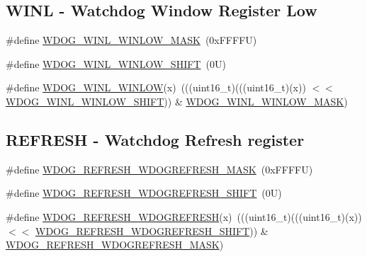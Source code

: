 \subsection*{W\+I\+NL -\/ Watchdog Window Register Low}
\begin{DoxyCompactItemize}
\item 
\#define \mbox{\hyperlink{group___w_d_o_g___register___masks_gadc36bfdccd5e9c14d063a5b36b6a3f6a}{W\+D\+O\+G\+\_\+\+W\+I\+N\+L\+\_\+\+W\+I\+N\+L\+O\+W\+\_\+\+M\+A\+SK}}~(0x\+F\+F\+F\+F\+U)
\item 
\#define \mbox{\hyperlink{group___w_d_o_g___register___masks_ga7f2baf848e4bfe9b0143d073467d1c1a}{W\+D\+O\+G\+\_\+\+W\+I\+N\+L\+\_\+\+W\+I\+N\+L\+O\+W\+\_\+\+S\+H\+I\+FT}}~(0\+U)
\item 
\#define \mbox{\hyperlink{group___w_d_o_g___register___masks_gab55f3f4203f758c69ed8ab7e41db69fd}{W\+D\+O\+G\+\_\+\+W\+I\+N\+L\+\_\+\+W\+I\+N\+L\+OW}}(x)~(((uint16\+\_\+t)(((uint16\+\_\+t)(x)) $<$$<$ \mbox{\hyperlink{group___w_d_o_g___register___masks_ga7f2baf848e4bfe9b0143d073467d1c1a}{W\+D\+O\+G\+\_\+\+W\+I\+N\+L\+\_\+\+W\+I\+N\+L\+O\+W\+\_\+\+S\+H\+I\+FT}})) \& \mbox{\hyperlink{group___w_d_o_g___register___masks_gadc36bfdccd5e9c14d063a5b36b6a3f6a}{W\+D\+O\+G\+\_\+\+W\+I\+N\+L\+\_\+\+W\+I\+N\+L\+O\+W\+\_\+\+M\+A\+SK}})
\end{DoxyCompactItemize}
\subsection*{R\+E\+F\+R\+E\+SH -\/ Watchdog Refresh register}
\begin{DoxyCompactItemize}
\item 
\#define \mbox{\hyperlink{group___w_d_o_g___register___masks_ga59e560838a4c519b514c0def0d6034fa}{W\+D\+O\+G\+\_\+\+R\+E\+F\+R\+E\+S\+H\+\_\+\+W\+D\+O\+G\+R\+E\+F\+R\+E\+S\+H\+\_\+\+M\+A\+SK}}~(0x\+F\+F\+F\+F\+U)
\item 
\#define \mbox{\hyperlink{group___w_d_o_g___register___masks_ga526acc27150ff67f1f026bdcc1bb364c}{W\+D\+O\+G\+\_\+\+R\+E\+F\+R\+E\+S\+H\+\_\+\+W\+D\+O\+G\+R\+E\+F\+R\+E\+S\+H\+\_\+\+S\+H\+I\+FT}}~(0\+U)
\item 
\#define \mbox{\hyperlink{group___w_d_o_g___register___masks_ga08d4fbad4e65e50bf94e1fbf5f48e065}{W\+D\+O\+G\+\_\+\+R\+E\+F\+R\+E\+S\+H\+\_\+\+W\+D\+O\+G\+R\+E\+F\+R\+E\+SH}}(x)~(((uint16\+\_\+t)(((uint16\+\_\+t)(x)) $<$$<$ \mbox{\hyperlink{group___w_d_o_g___register___masks_ga526acc27150ff67f1f026bdcc1bb364c}{W\+D\+O\+G\+\_\+\+R\+E\+F\+R\+E\+S\+H\+\_\+\+W\+D\+O\+G\+R\+E\+F\+R\+E\+S\+H\+\_\+\+S\+H\+I\+FT}})) \& \mbox{\hyperlink{group___w_d_o_g___register___masks_ga59e560838a4c519b514c0def0d6034fa}{W\+D\+O\+G\+\_\+\+R\+E\+F\+R\+E\+S\+H\+\_\+\+W\+D\+O\+G\+R\+E\+F\+R\+E\+S\+H\+\_\+\+M\+A\+SK}})
\end{DoxyCompactItemize}
